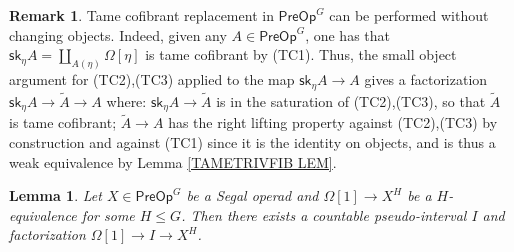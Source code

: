 \documentclass[a4paper,10pt]{article}%
\numberwithin{equation}{section}
\numberwithin{figure}{section}
\newtheorem{lemma}[equation]{Lemma}%
\theoremstyle{definition} %
\newtheorem{remark}[equation]{Remark}%
\newcommand{\1}{\ensuremath{\mathbbm 1}}%
\begin{document}
\begin{remark}\label{TC2TC3REP REM}
	Tame cofibrant replacement in $\mathsf{PreOp}^G$
	can be performed without changing objects.
	Indeed, given any 
	$A \in \mathsf{PreOp}^G$,
	one has that
	$\mathsf{sk}_{\eta} A = 
	\coprod_{A(\eta)} \Omega[\eta]$
	is tame cofibrant by (TC1).
	Thus, the small object argument for (TC2),(TC3) 
	applied to the map 
	$\mathsf{sk}_{\eta} A \to A$
	gives a factorization
	$\mathsf{sk}_{\eta} A \to \widetilde{A} \to A$
	where:
	$\mathsf{sk}_{\eta} A \to \widetilde{A}$
	is in the saturation of (TC2),(TC3), so that
	$\widetilde{A}$ is tame cofibrant;
	$\widetilde{A} \to A$
	has the right lifting property against 
	(TC2),(TC3) by construction and against (TC1)
	since it is the identity on objects, 
	and is thus a weak equivalence by 
	Lemma \ref{TAMETRIVFIB LEM}.
\end{remark}



\begin{lemma}\label{SLIMOD LEM}
	Let $X \in \mathsf{PreOp}^G$
	be a Segal operad
	and $\Omega[1] \to X^H$
	be a $H$-equivalence for some $H \leq G$.
	Then there exists a countable
	pseudo-interval $I$
	and factorization
	$\Omega[1] \to I \to X^H$.
\end{lemma}
\end{document}
